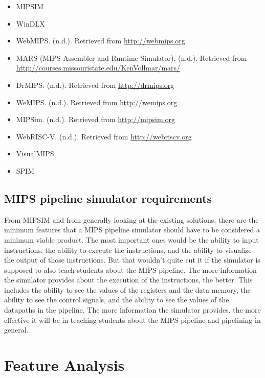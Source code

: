 \begin{itemize}
    \item MIPSIM\cite{grunbacher1996windlx}
    \item WinDLX\cite{grunbacher1996windlx}
    \item WebMIPS. (n.d.). Retrieved from \url{http://webmips.org}
    \item MARS (MIPS Assembler and Runtime Simulator). (n.d.). Retrieved from \url{http://courses.missouristate.edu/KenVollmar/mars/}
    \item DrMIPS. (n.d.). Retrieved from \url{http://drmips.org}
    \item WeMIPS. (n.d.). Retrieved from \url{http://wemips.org}
    \item MIPSim. (n.d.). Retrieved from \url{http://mipsim.org}
    \item WebRISC-V. (n.d.). Retrieved from \url{http://webriscv.org}
    \item VisualMIPS\cite{visualmips}
    \item SPIM
\end{itemize}

\subsection{MIPS pipeline simulator requirements}\label{sec:mips_pipeline_simulator_requirements}

From MIPSIM and from generally looking at the existing solutions, there are the minimum features that a MIPS pipeline simulator should have to be considered a minimum viable product. The most important ones would be the ability to input instructions, the ability to execute the instructions, and the ability to visualize the output of those instructions. But that wouldn't quite cut it if the simulator is supposed to also teach students about the MIPS pipeline. The more information the simulator provides about the execution of the instructions, the better. This includes the ability to see the values of the registers and the data memory, the ability to see the control signals, and the ability to see the values of the datapaths in the pipeline. The more information the simulator provides, the more effective it will be in teaching students about the MIPS pipeline and pipelining in general.


\section{Feature Analysis}\label{sec:feature_comparison}

